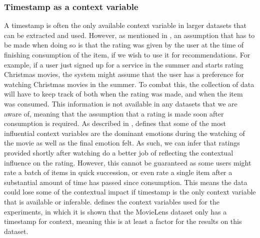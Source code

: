 \subsubsection{Timestamp as a context variable}
A timestamp is often the only available context variable in larger datasets that can be extracted and used.
However, as mentioned in , an assumption that has to be made when doing so is that the rating was given by the user at the time of finishing consumption of the item, if we wish to use it for recommendations.
For example, if a user just signed up for a service in the summer and starts rating Christmas movies, the system might assume that the user has a preference for watching Christmas movies in the summer.
To combat this, the collection of data will have to keep track of both when the rating was made, and when the item was consumed.
This information is not available in any datasets that we are aware of, meaning that the assumption that a rating is made soon after consumption is required.
As described in , \cite{COMODA2013} defines that some of the most influential context variables are the dominant emotions during the watching of the movie as well as the final emotion felt.
As such, we can infer that ratings provided shortly after watching do a better job of reflecting the contextual influence on the rating.
However, this cannot be guaranteed as some users might rate a batch of items in quick succession, or even rate a single item after a substantial amount of time has passed since consumption.
This means the data could lose some of the contextual impact if timestamp is the only context variable that is available or inferable.
 defines the context variables used for the experiments, in which it is shown that the MovieLens dataset only has a timestamp for context, meaning this is at least a factor for the results on this dataset. 

